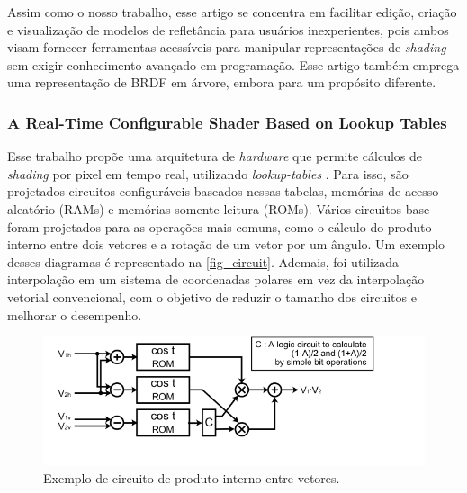 Assim como o nosso trabalho, esse artigo se concentra em facilitar edição, criação e visualização de modelos de refletância para usuários inexperientes, pois ambos visam fornecer ferramentas acessíveis para manipular representações de \textit{shading} sem exigir conhecimento avançado em programação. Esse artigo também emprega uma representação de BRDF em árvore, embora para um propósito diferente.


\subsubsection{A Real-Time Configurable Shader Based on Lookup Tables}


Esse trabalho propõe uma arquitetura de \textit{hardware} que permite cálculos de \textit{shading} por pixel em tempo real, utilizando \textit{lookup-tables} \cite{configurable}. Para isso, são projetados circuitos configuráveis baseados nessas tabelas, memórias de acesso aleatório (RAMs) e memórias somente leitura (ROMs). Vários circuitos base foram projetados para as operações mais comuns, como o cálculo do produto interno entre dois vetores e a rotação de um vetor por um ângulo. Um exemplo desses diagramas é representado na \autoref{fig_circuit}. Ademais, foi utilizada interpolação em um sistema de coordenadas polares em vez da interpolação vetorial convencional, com o objetivo de reduzir o tamanho dos circuitos e melhorar o desempenho.





\begin{figure}[H]
        \caption{\label{fig_circuit}\small Exemplo de circuito de produto interno entre vetores.}
        \begin{center}
            \includegraphics[scale=0.7]{./Imagens/rom-cos-lookup-table.png}
        \end{center}
\end{figure}



